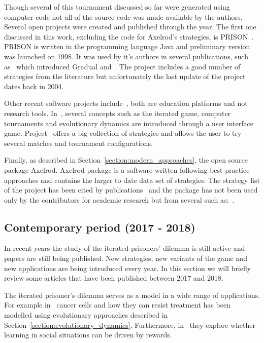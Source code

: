 \documentclass{article}
\theoremstyle{definition}
\begin{document}
Though several of this tournament discussed so far were generated using computer
code not all of the source code was made available by the authors. Several
open projects were created and published through the year. The first one
discussed in this work, excluding the code for Axelrod's strategies, is 
PRISON~\cite{prison}. PRISON is written in the programming language Java and
preliminary version was launched on 1998. It was used by it's authors in several
publications, such as~\cite{Beaufils1997} which introduced Gradual and~\cite{Beaufils1988}.
The project includes a good number of strategies from the
literature but unfortunately the last update of the project dates back in 2004.

Other recent software projects include~\cite{pd_trust, pd_game}, both are education
platforms and not research tools. In~\cite{pd_trust}, several concepts such as
the iterated game, computer tournaments and evolutionary dynamics are introduced
through a user interface game. Project~\cite{pd_game} offers a big collection of
strategies and allows the user to try several matches and tournament configurations.

Finally, as described in Section~\ref{section:modern_approaches}, the open source
package Axelrod. Axelrod package is a software written following best practice
approaches and contains the larger to date data set of strategies. The strategy
list of the project has been cited by publications~\cite{Neumann2018} and
the package has not been used only by the contributors for academic research but
from several such as:~\cite{Latorre2018}.


\subsection{Contemporary period (2017 - 2018)}\label{section:contemporary_period}

In recent years the study of the iterated prisoners' dilemma is still active
and papers are still being published. New strategies, new variants of the game
and new applications are being introduced every year. In this section we will
briefly review some articles that have been published between 2017 and 2018.

The iterated prisoner's dilemma serves as a model in a wide range of applications.
For example in~\cite{Kaznatchee2017} cancer cells and how they can resist treatment has been
modelled using evolutionary approaches described in Section~\ref{section:evolutionary_dynamics}.
Furthermore, in~\cite{Dridi2018} they explore whether learning in social situations
can be driven by rewards.
\end{document}

